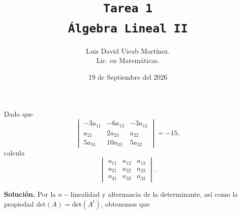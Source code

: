 \documentclass[11pt]{scrartcl}
\title{\texttt{Tarea 1
\\ Álgebra Lineal II}}
\author{Luis David Uicab Martínez. 
\\Lic. en Matemáticas.}
\date{19 de Septiembre del 2026}
\begin{document}
\maketitle
\begin{mdframed}[style=mdpurplebox, frametitle={Ejercicio 1, Tarea 01, Álgebra Lineal II}]
    Dado que
    \begin{equation*}
        \begin{vmatrix}
            -3a_{11} & -6a_{13} & -3a_{12} \\
            a_{21} & 2a_{23} & a_{22} \\
            5a_{31} & 10a_{33} & 5a_{32}
        \end{vmatrix}=-15,
    \end{equation*}
    calcula
    \begin{equation*}
        \begin{vmatrix}
            a_{11} & a_{12} & a_{13} \\
            a_{21} & a_{22} & a_{23} \\
            a_{31} & a_{32} & a_{33}
        \end{vmatrix}.
    \end{equation*}
\end{mdframed}
\textbf{Solución.} Por la $n-$linealidad y alternancia de la determinante, así como la propiedad det$(A)=$det$(A^t)$,
obtenemos que
\end{document}
